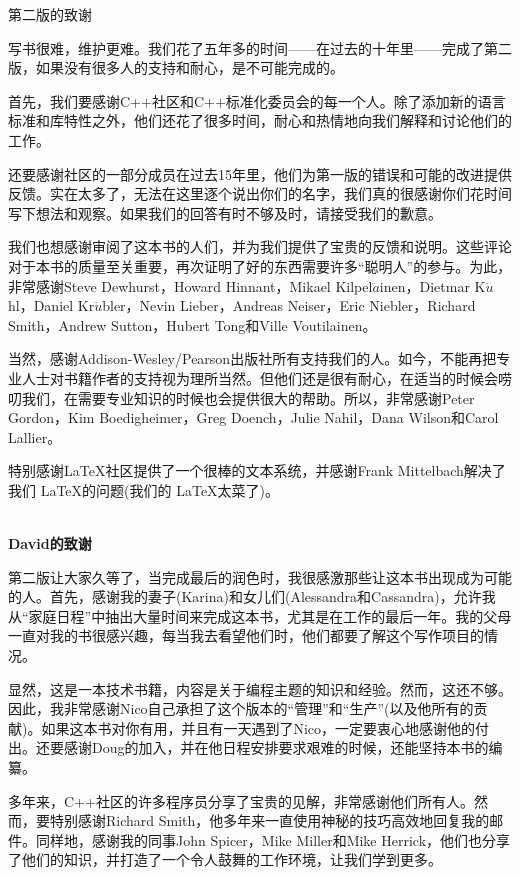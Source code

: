 \begin{flushright}
 第二版的致谢
\end{flushright}

写书很难，维护更难。我们花了五年多的时间——在过去的十年里——完成了第二版，如果没有很多人的支持和耐心，是不可能完成的。

首先，我们要感谢C++社区和C++标准化委员会的每一个人。除了添加新的语言标准和库特性之外，他们还花了很多时间，耐心和热情地向我们解释和讨论他们的工作。

还要感谢社区的一部分成员在过去15年里，他们为第一版的错误和可能的改进提供反馈。实在太多了，无法在这里逐个说出你们的名字，我们真的很感谢你们花时间写下想法和观察。如果我们的回答有时不够及时，请接受我们的歉意。

我们也想感谢审阅了这本书的人们，并为我们提供了宝贵的反馈和说明。这些评论对于本书的质量至关重要，再次证明了好的东西需要许多“聪明人”的参与。为此，非常感谢Steve Dewhurst，Howard Hinnant，Mikael Kilpel$\ddot{a}$inen，Dietmar K$\ddot{u}$hl，Daniel Kr$\ddot{u}$bler，Nevin Lieber，Andreas Neiser，Eric Niebler，Richard Smith，Andrew Sutton，Hubert Tong和Ville Voutilainen。

当然，感谢Addison-Wesley/Pearson出版社所有支持我们的人。如今，不能再把专业人士对书籍作者的支持视为理所当然。但他们还是很有耐心，在适当的时候会唠叨我们，在需要专业知识的时候也会提供很大的帮助。所以，非常感谢Peter Gordon，Kim Boedigheimer，Greg Doench，Julie Nahil，Dana
Wilson和Carol Lallier。

特别感谢LaTeX社区提供了一个很棒的文本系统，并感谢Frank Mittelbach解决了我们 \LaTeX 的问题(我们的 \LaTeX 太菜了)。

\hspace*{\fill} \\ %
\noindent\textbf{David的致谢}

第二版让大家久等了，当完成最后的润色时，我很感激那些让这本书出现成为可能的人。首先，感谢我的妻子(Karina)和女儿们(Alessandra和Cassandra)，允许我从“家庭日程”中抽出大量时间来完成这本书，尤其是在工作的最后一年。我的父母一直对我的书很感兴趣，每当我去看望他们时，他们都要了解这个写作项目的情况。

显然，这是一本技术书籍，内容是关于编程主题的知识和经验。然而，这还不够。因此，我非常感谢Nico自己承担了这个版本的“管理”和“生产”(以及他所有的贡献)。如果这本书对你有用，并且有一天遇到了Nico，一定要衷心地感谢他的付出。还要感谢Doug的加入，并在他日程安排要求艰难的时候，还能坚持本书的编纂。

多年来，C++社区的许多程序员分享了宝贵的见解，非常感谢他们所有人。然而，要特别感谢Richard Smith，他多年来一直使用神秘的技巧高效地回复我的邮件。同样地，感谢我的同事John Spicer，Mike Miller和Mike Herrick，他们也分享了他们的知识，并打造了一个令人鼓舞的工作环境，让我们学到更多。

